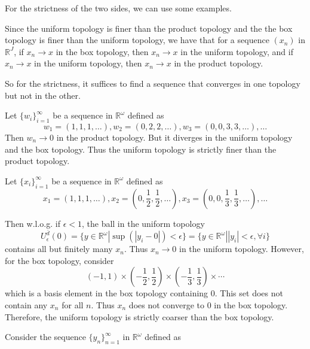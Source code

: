 \documentclass[main.tex]{subfiles}
\begin{document}
\par For the strictness of the two sides, we can use some examples. 
\par Since the uniform topology is finer than the product topology and the the box topology is finer than the uniform topology, we have that for a sequence $(x_n)$ in $\mathbb{R}^{J}$, if $x_n \rightarrow x$ in the box topology, then $x_n \rightarrow x$ in the uniform topology, and if $x_n \rightarrow x$ in the uniform topology, then $x_n \rightarrow x$ in the product topology. 
\par So for the strictness, it suffices to find a sequence that converges in one topology but not in the other. 
\par Let $\{w_i\}_{i=1}^{\infty}$ be a sequence in $\mathbb{R}^{\omega}$ defined as 
\begin{equation}
    w_1 = (1, 1, 1, \ldots), w_2 = (0, 2, 2, \ldots), w_3 = (0, 0, 3, 3, \ldots), \ldots
\end{equation}
Then $w_n \rightarrow 0$ in the product topology. But it diverges in the uniform topology and the box topology. Thus the uniform topology is strictly finer than the product topology. 
\par Let $\{x_i\}_{i=1}^{\infty}$ be a sequence in $\mathbb{R}^{\omega}$ defined as
\begin{equation}
    x_1 = (1, 1, 1, \ldots), x_2 = (0, \frac{1}{2}, \frac{1}{2}, \ldots), x_3 = (0, 0, \frac{1}{3}, \frac{1}{3}, \ldots), \ldots
\end{equation}
\par Then w.l.o.g. if $\epsilon < 1$, the ball in the uniform topology 
\begin{equation}
    U_{\epsilon}^{\bar{d}}(0) = \{y \in \mathbb{R}^{\omega} | \sup(|y_i - 0|) < \epsilon\} = \{y \in \mathbb{R}^{\omega} | |y_i| < \epsilon, \forall i\}
\end{equation}
contains all but finitely many $x_n$. Thus $x_n \rightarrow 0$ in the uniform topology. However, for the box topology, consider 
\begin{equation}
    (-1, 1) \times (-\frac{1}{2}, \frac{1}{2}) \times (-\frac{1}{3}, \frac{1}{3}) \times \cdots
\end{equation}
which is a basis element in the box topology containing $0$. This set does not contain any $x_n$ for all $n$. Thus $x_n$ does not converge to $0$ in the box topology. Therefore, the uniform topology is strictly coarser than the box topology. 
\par Consider the sequence $\{y_n\}_{n=1}^{\infty}$ in $\mathbb{R}^{\omega}$ defined as 
\end{document}
